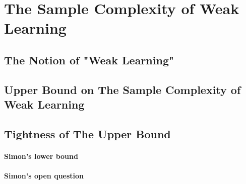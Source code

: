     


\section{The Sample Complexity of Weak Learning}

\blindmathpaper

    


\subsection{The Notion of "Weak Learning"}

\blindmathpaper

    



\subsection{Upper Bound on The Sample Complexity of Weak Learning}

\blindmathpaper

    



\subsection{Tightness of The Upper Bound}

\blindmathpaper

    


\paragraph{Simon's lower bound}

\blindmathpaper

    



\paragraph{Simon's open question}

\blindmathpaper

    



